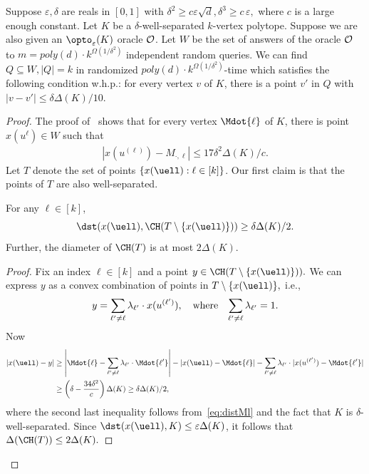 \begin{theorem}\label{upper-bound-kolp}
Suppose $\varepsilon,\delta$ are reals in $[0,1]$ with $\delta^2\geq c\varepsilon\sqrt d, \delta^3 \geq c \, \varepsilon,$ where $c$ is a large enough constant.  Let $K$ be a $\delta$-well-separated $k$-vertex polytope. Suppose we are also given an  $ \opto_\varepsilon(K)$ oracle $\cal O$. 
Let $W$ be the set of answers of the oracle $\cal O$ to $m=poly(d)\cdot k^{\Omega(1/\delta^2)}$ independent random queries. We can find $Q\subseteq W, |Q|=k$ in 
randomized $poly(d) \cdot k^{\Omega(1/\delta^2)}$-time which satisfies the following condition w.h.p.:  for every vertex $v$ of $K$, there is a point $v'$ in $Q$ with $|v-v'| \leq \delta \Delta(K)/10$. 
\end{theorem}
\begin{proof}
    The proof of~ shows that  for every vertex  $\Mdot{\ell}$ of $K$, there is point $x(u^{\ell}) \in W$ such that 
    \begin{align}
        \label{eq:distMl}
          |x(u^{(\ell)})-M_{\cdot,\ell}|\leq 17 \delta^2 \Delta(K)/c.
    \end{align}
    Let $T$ denote the set of points $\{x(\uell): \ell \in [k]\}$. Our first claim is that the points of $T$ are also well-separated. 

\begin{claim}
\label{cl:wellstx}
For any $\ell \in [k]$, 
$$\dst(x(\uell), \CH(T \setminus \{x(\uell)\})) \geq \delta \Delta(K)/2.$$ Further, the diameter of $\CH(T)$ is at most $2 \Delta(K). $
\end{claim}
\begin{proof}
    Fix an index $\ell \in [k]$ and a point $y \in \CH(T \setminus \{x(\uell)\})).$ We can express $y$ as a convex  combination of points in $T \setminus \{x(\uell)\},$ i.e., 
    $$ y = \sum_{\ell' \neq \ell} \lambda_{\ell'} \cdot x(u^{(\ell')}), \quad \mbox{where \,  } \sum_{\ell' \neq \ell} \lambda_{\ell'} = 1.$$ Now
    \begin{align*}
        |x(\uell) - y| & \geq \left| \Mdot{\ell} - \sum_{\ell' \neq \ell} \lambda_{\ell'} \cdot \Mdot{\ell'} \right| - |x(\uell) - \Mdot{\ell}| - \sum_{\ell' \neq \ell} \lambda_{\ell'} \cdot |x(u^{(\ell')})-\Mdot{\ell'}| \\
        & \geq \left(\delta - \frac{34 \delta^2}{c} \right) \Delta(K) \geq \delta \Delta(K)/2,
    \end{align*}  
    where the second last inequality follows from~\eqref{eq:distMl} and the fact that $K$ is $\delta$-well-separated. 
    Since $\dst(x(\uell), K) \leq \varepsilon \Delta(K)$, it follows that $\Delta(\CH(T)) \leq 2 \Delta(K).$
\end{proof}


\end{proof}
